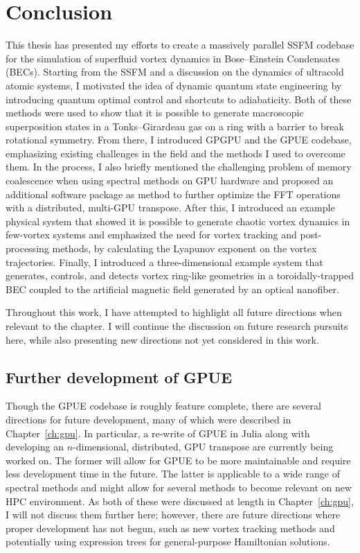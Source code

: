 \chapter{Conclusion}

\label{ch:conclusion}

This thesis has presented my efforts to create a massively parallel SSFM codebase for the simulation of superfluid vortex dynamics in Bose--Einstein Condensates (BECs).
Starting from the SSFM and a discussion on the dynamics of ultracold atomic systems, I motivated the idea of dynamic quantum state engineering by introducing quantum optimal control and shortcuts to adiabaticity.
Both of these methods were used to show that it is possible to generate macroscopic superposition states in a Tonks--Girardeau gas on a ring with a barrier to break rotational symmetry.
From there, I introduced GPGPU and the GPUE codebase, emphasizing existing challenges in the field and the methods I used to overcome them.
In the process, I also briefly mentioned the challenging problem of memory coalescence when using spectral methods on GPU hardware and proposed an additional software package as method to further optimize the FFT operations with a distributed, multi-GPU transpose.
After this, I introduced an example physical system that showed it is possible to generate chaotic vortex dynamics in few-vortex systems and emphasized the need for vortex tracking and post-processing methods, by calculating the Lyapunov exponent on the vortex trajectories.
Finally, I introduced a three-dimensional example system that generates, controls, and detects vortex ring-like geometries in a toroidally-trapped BEC coupled to the artificial magnetic field generated by an optical nanofiber.

Throughout this work, I have attempted to highlight all future directions when relevant to the chapter.
I will continue the discussion on future research pursuits here, while also presenting new directions not yet considered in this work.

\section{Further development of GPUE}

Though the GPUE codebase is roughly feature complete, there are several directions for future development, many of which were described in Chapter~\ref{ch:gpu}.
In particular, a re-write of GPUE in Julia along with developing an $n$-dimensional, distributed, GPU transpose are currently being worked on.
The former will allow for GPUE to be more maintainable and require less development time in the future.
The latter is applicable to a wide range of spectral methods and might allow for several methods to become relevant on new HPC environment.
As both of these were discussed at length in Chapter~\ref{ch:gpu}, I will not discuss them further here; however,
there are future directions where proper development has not begun, such as new vortex tracking methods and potentially using expression trees for general-purpose Hamiltonian solutions.

